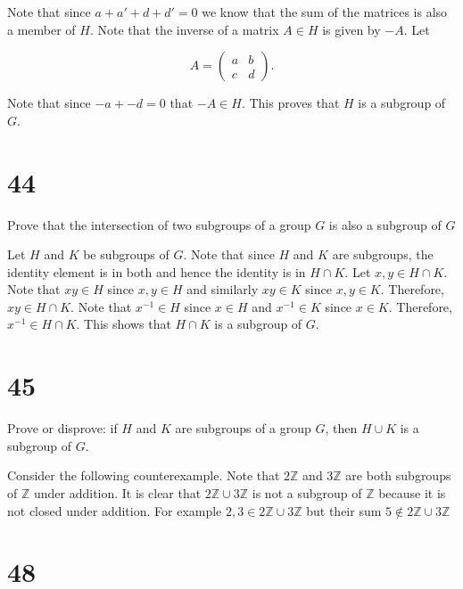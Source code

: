 \documentclass[a4paper]{article}
\begin{document}
Note that since $a + a' + d + d' = 0$ we know that the sum of the matrices is also a member of $H$. Note that the inverse of a matrix $A \in H$ is given by $-A$. Let 

$$A = 
  \begin{pmatrix}
    a & b \\
    c & d
  \end{pmatrix}.
$$

Note that since $-a + -d = 0$ that $-A \in H$. This proves that $H$ is a subgroup of $G$.


\section*{44}

Prove that the intersection of two subgroups of a group $G$ is also a subgroup of $G$

\vspace{\baselineskip}

Let $H$ and $K$ be subgroups of $G$. Note that since $H$ and $K$ are subgroups, the identity element is in both and hence the identity is in $H \cap K$. Let $x,y \in H \cap K$. Note that $xy \in H$ since $x,y \in H$ and similarly $xy \in K$ since $x,y \in K$. Therefore, $xy \in H \cap K$. Note that $x^{-1} \in H$ since $x \in H$ and $x^{-1} \in K$ since $x \in K$. Therefore, $x^{-1} \in H \cap K$. This shows that $H \cap K$ is a subgroup of $G$.



\section*{45}

Prove or disprove: if $H$ and $K$ are subgroups of a group $G$, then $H \cup K$ is a subgroup of $G$.

\vspace{\baselineskip}

Consider the following counterexample. Note that $2\mathbb{Z}$ and $3\mathbb{Z}$ are both subgroups of $\mathbb{Z}$ under addition. It is clear that $2\mathbb{Z} \cup 3\mathbb{Z}$ is not a subgroup of $\mathbb{Z}$ because it is not closed under addition. For example $2,3 \in 2\mathbb{Z} \cup 3\mathbb{Z}$ but their sum $5 \not\in 2\mathbb{Z} \cup 3\mathbb{Z}$


\section*{48}
\end{document}
